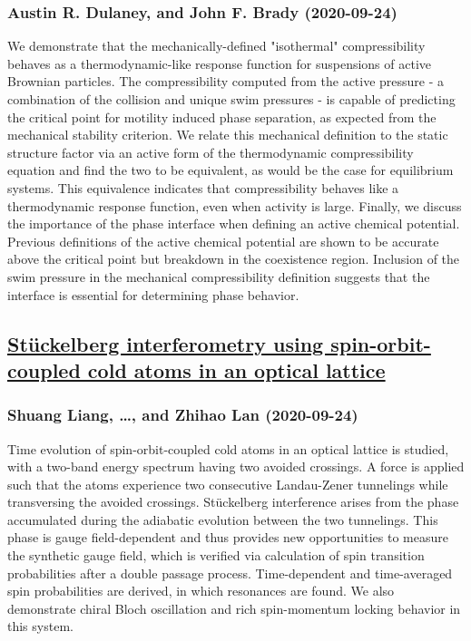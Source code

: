 \subsubsection*{Austin R. Dulaney, and John F. Brady (2020-09-24)}
We demonstrate that the mechanically-defined "isothermal" compressibility
behaves as a thermodynamic-like response function for suspensions of active
Brownian particles. The compressibility computed from the active pressure - a
combination of the collision and unique swim pressures - is capable of
predicting the critical point for motility induced phase separation, as
expected from the mechanical stability criterion. We relate this mechanical
definition to the static structure factor via an active form of the
thermodynamic compressibility equation and find the two to be equivalent, as
would be the case for equilibrium systems. This equivalence indicates that
compressibility behaves like a thermodynamic response function, even when
activity is large. Finally, we discuss the importance of the phase interface
when defining an active chemical potential. Previous definitions of the active
chemical potential are shown to be accurate above the critical point but
breakdown in the coexistence region. Inclusion of the swim pressure in the
mechanical compressibility definition suggests that the interface is essential
for determining phase behavior.

\subsection*{\href{http://arxiv.org/abs/2009.11438v1}{Stückelberg interferometry using spin-orbit-coupled cold atoms in an  optical lattice}}
\subsubsection*{Shuang Liang, \dots, and Zhihao Lan (2020-09-24)}
Time evolution of spin-orbit-coupled cold atoms in an optical lattice is
studied, with a two-band energy spectrum having two avoided crossings. A force
is applied such that the atoms experience two consecutive Landau-Zener
tunnelings while transversing the avoided crossings. St\"uckelberg interference
arises from the phase accumulated during the adiabatic evolution between the
two tunnelings. This phase is gauge field-dependent and thus provides new
opportunities to measure the synthetic gauge field, which is verified via
calculation of spin transition probabilities after a double passage process.
Time-dependent and time-averaged spin probabilities are derived, in which
resonances are found. We also demonstrate chiral Bloch oscillation and rich
spin-momentum locking behavior in this system.

